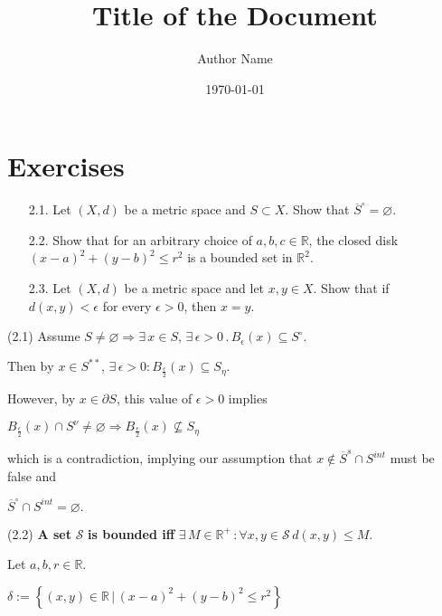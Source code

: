 \documentclass{article}
\title{\textbf{Title of the Document}}
\author{Author Name}
\date{\today}
\theoremstyle{definition}
\numberwithin{equation}{section}
\begin{document}
\maketitle
\tableofcontents
\newpage
\section{Exercises}
\begin{itemize}
    \item[2.1.] Let $(X, d)$ be a metric space and $S \subset X$. Show that $\overline{S}^\circ = \varnothing$.
    \item[2.2.] Show that for an arbitrary choice of $a, b, c \in \mathbb{R}$, the closed disk $(x - a)^2 + (y - b)^2 \leq r^2$ is a bounded set in $\mathbb{R}^2$.
    \item[2.3.] Let $(X, d)$ be a metric space and let $x, y \in X$. Show that if $d(x, y) < \epsilon$ for every $\epsilon > 0$, then $x = y$.
\end{itemize}

\noindent (2.1) Assume $S \neq \varnothing \Rightarrow \exists \, x \in S, \, \exists \, \epsilon > 0 \, . \, B_\epsilon(x) \subseteq S^\circ$.

$
\text{Then by } x \in S^{\ast\ast}, \, \exists \, \epsilon > 0: B_\frac{\epsilon}{2}(x) \subseteq S_\eta.
$

\noindent However, by $x \in \partial S$, this value of $\epsilon > 0$ implies

$
B_{\frac{\epsilon}{2}}(x) \cap S^\nu \neq \varnothing \Rightarrow B_{\frac{\epsilon}{2}}(x) \not\subseteq S_\eta
$

\noindent which is a contradiction, implying our assumption that $x \not\in \overline{S}^s \cap S^{int}$ must be false and

$
\overline{S}^\circ \cap S^{int} = \varnothing.
$

\vspace{1cm}

\noindent (2.2) \textbf{A set } $\mathcal{S}$ \textbf{is bounded iff } $\exists \, M \in \mathbb{R}^+ \, : \forall x, y \in \mathcal{S} \, d(x, y) \leq M$.

\noindent Let $a, b, r \in \mathbb{R}$.

$
\delta := \left\lbrace (x, y) \in \mathbb{R} \, | \, (x - a)^2 + (y - b)^2 \leq r^2 \right\rbrace
$

\noindent{}

\noindent{}
\end{document}
